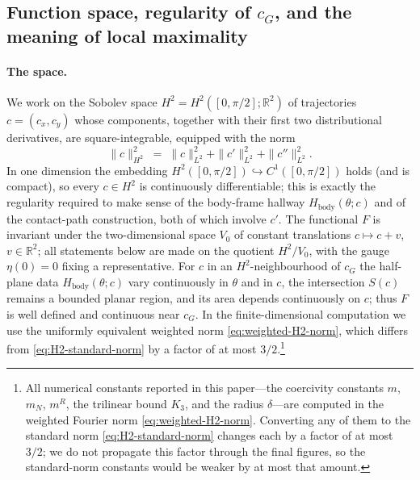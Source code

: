 \documentclass[11pt]{amsart}
\theoremstyle{plain}
\theoremstyle{definition}
\newcommand{\R}{\mathbb{R}}
\newcommand{\cG}{c_{G}}
\newcommand{\Hbody}{H_{\mathrm{body}}}
\begin{document}
\subsection{Function space, regularity of $\cG$, and the meaning of
local maximality}\label{sec:space-regularity}

\paragraph{The space.}
We work on the Sobolev space $H^{2} = H^{2}([0,\pi/2];\R^{2})$ of
trajectories $c = (c_{x}, c_{y})$ whose components, together with their
first two distributional derivatives, are square-integrable, equipped
with the norm
\begin{equation}\label{eq:H2-standard-norm}
  \|c\|_{H^{2}}^{2} \;=\;
   \|c\|_{L^{2}}^{2} + \|c'\|_{L^{2}}^{2} + \|c''\|_{L^{2}}^{2}.
\end{equation}
In one dimension the embedding $H^{2}([0,\pi/2]) \hookrightarrow
C^{1}([0,\pi/2])$ holds (and is compact), so every $c \in H^{2}$ is
continuously differentiable; this is exactly the regularity required to
make sense of the body-frame hallway $\Hbody(\theta; c)$ and of the
contact-path construction, both of which involve $c'$.  The functional
$F$ is invariant under the two-dimensional space $V_{0}$ of constant
translations $c \mapsto c + v$, $v \in \R^{2}$; all statements below
are made on the quotient $H^{2}/V_{0}$, with the gauge $\eta(0) = 0$
fixing a representative.  For $c$ in an $H^{2}$-neighbourhood of $\cG$
the half-plane data $\Hbody(\theta; c)$ vary continuously in $\theta$
and in $c$, the intersection $S(c)$ remains a bounded planar region,
and its area depends continuously on $c$; thus $F$ is well defined and
continuous near $\cG$.  In the finite-dimensional computation we use
the uniformly equivalent weighted norm \eqref{eq:weighted-H2-norm},
which differs from \eqref{eq:H2-standard-norm} by a factor of at most
$3/2$.\footnote{All numerical constants reported in this paper---the
coercivity constants $m$, $m_{N}$, $m^{R}$, the trilinear bound
$K_{3}$, and the radius $\delta$---are computed in the weighted
Fourier norm \eqref{eq:weighted-H2-norm}.  Converting any of them to
the standard norm \eqref{eq:H2-standard-norm} changes each by a
factor of at most $3/2$; we do not propagate this factor through the
final figures, so the standard-norm constants would be weaker by at
most that amount.}
\end{document}
